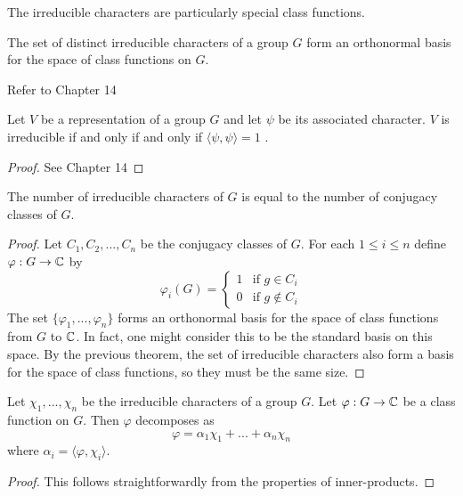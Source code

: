 The irreducible characters are particularly special class functions.
\begin{theorem}
    The set of distinct irreducible characters of a group $G$ form an orthonormal basis for the space of class 
    functions on $G$.
\end{theorem}
Refer to \cite{James&Liebeck} Chapter 14
\begin{theorem}
    Let $V$ be a representation of a group $G$ and let $\psi$ be its associated character.  $V$ is irreducible if 
    and only if and only if $\langle \psi, \psi \rangle = 1$ .
\end{theorem}

\begin{proof}
    See \cite{James&Liebeck} Chapter 14
\end{proof}




\begin{corollary}
    The number of irreducible characters of $G$ is equal to the number of conjugacy classes of $G$.
\end{corollary}
\begin{proof}
    Let $C_1, C_2, ..., C_n$ be the conjugacy classes of $G$. For each $1 \leq i \leq n$ define $\varphi : G 
    \rightarrow \mathbb{C}$ by
    \[
        \varphi_i(G) =
        \begin{cases}
            1 &\text{if } g \in C_i \\
            0 &\text{if } g \not\in C_i
        \end{cases}
    \]
    The set $\{\varphi_1, ..., \varphi_n \}$ forms an orthonormal basis for the space of class functions from $G$ 
    to $\mathbb{C}$. In fact, one might consider this to be the standard basis on this space. By the previous theorem, the 
    set of irreducible characters also form a basis for the space of class functions, so they must be the same 
    size.
\end{proof}

    
\begin{corollary}
    Let $\chi_1, ..., \chi_n$ be the irreducible characters of a group $G$. Let $\varphi : G \rightarrow \mathbb{C}$ be a 
    class function on $G$. Then $\varphi$ decomposes as 
    \[
       \varphi = \alpha_1 \chi_1 + ... + \alpha_n \chi_n
    \]
    where $\alpha_i = \langle \varphi, \chi_i \rangle$.
\end{corollary}
\begin{proof}
    This follows straightforwardly from the properties of inner-products.
\end{proof}

